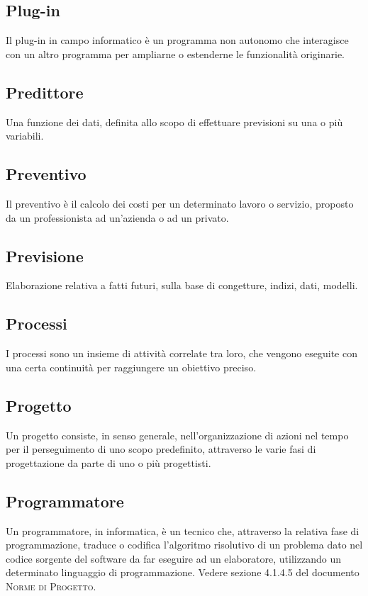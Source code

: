 
\subsection*{Plug-in}
Il plug-in in campo informatico è un programma non autonomo che interagisce con un altro programma per ampliarne o estenderne le funzionalità originarie.

\subsection*{Predittore}
Una funzione dei dati, definita allo scopo di effettuare previsioni su una o più variabili.

\subsection*{Preventivo}
Il preventivo è il calcolo dei costi per un determinato lavoro o servizio, proposto da un professionista ad un'azienda o ad un privato.

\subsection*{Previsione}
Elaborazione relativa a fatti futuri, sulla base di congetture, indizi, dati, modelli.

\subsection*{Processi}
I processi sono un insieme di attività correlate tra loro, che vengono eseguite con una certa continuità per raggiungere un obiettivo preciso.

\subsection*{Progetto}
Un progetto consiste, in senso generale, nell'organizzazione di azioni nel tempo per il perseguimento di uno scopo predefinito, attraverso le varie fasi di progettazione da parte di uno o più progettisti.

\subsection*{Programmatore}
Un programmatore, in informatica, è un tecnico che, attraverso la relativa fase di programmazione, traduce o codifica l'algoritmo risolutivo di un problema dato nel codice sorgente del software da far eseguire ad un elaboratore, utilizzando un determinato linguaggio di programmazione. Vedere sezione 4.1.4.5 del documento \textsc{Norme di Progetto}.

